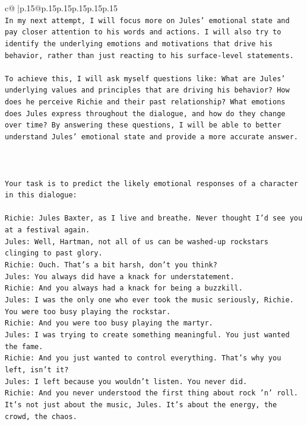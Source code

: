 \documentclass{article}
\begin{document}
{\begin{supertabular}{c@{$\;$}|p{.15\linewidth}@{}p{.15\linewidth}p{.15\linewidth}p{.15\linewidth}p{.15\linewidth}p{.15\linewidth}}
{{{\\ 
\texttt{In my next attempt, I will focus more on Jules' emotional state and pay closer attention to his words and actions. I will also try to identify the underlying emotions and motivations that drive his behavior, rather than just reacting to his surface{-}level statements. } \\
\\ 
\texttt{To achieve this, I will ask myself questions like: What are Jules' underlying values and principles that are driving his behavior? How does he perceive Richie and their past relationship? What emotions does Jules express throughout the dialogue, and how do they change over time? By answering these questions, I will be able to better understand Jules' emotional state and provide a more accurate answer.} \\
\\ 
\\ 
\\ 
\texttt{Your task is to predict the likely emotional responses of a character in this dialogue:} \\
\\ 
\texttt{Richie: Jules Baxter, as I live and breathe. Never thought I'd see you at a festival again.} \\
\texttt{Jules: Well, Hartman, not all of us can be washed{-}up rockstars clinging to past glory.} \\
\texttt{Richie: Ouch. That's a bit harsh, don't you think?} \\
\texttt{Jules: You always did have a knack for understatement.} \\
\texttt{Richie: And you always had a knack for being a buzzkill. } \\
\texttt{Jules: I was the only one who ever took the music seriously, Richie. You were too busy playing the rockstar.} \\
\texttt{Richie: And you were too busy playing the martyr. } \\
\texttt{Jules: I was trying to create something meaningful. You just wanted the fame.} \\
\texttt{Richie: And you just wanted to control everything. That's why you left, isn't it?} \\
\texttt{Jules: I left because you wouldn’t listen. You never did.} \\
\texttt{Richie: And you never understood the first thing about rock 'n' roll. It's not just about the music, Jules. It's about the energy, the crowd, the chaos.} \\
}}}
\end{supertabular}}
\end{document}
